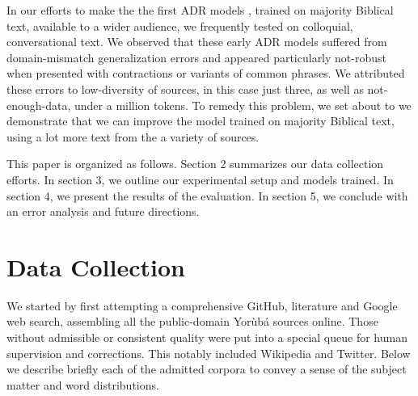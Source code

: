 \documentclass{article} %
\begin{document}
In our efforts to make the the first ADR models \citep{orife2018adr}, trained on majority Biblical text, available to a wider audience, we frequently tested on colloquial, conversational text. We observed that these early ADR models suffered from domain-mismatch generalization errors and appeared particularly not-robust when presented with contractions or variants of common phrases. We attributed these errors to low-diversity of sources, in this case just three, as well as not-enough-data, under a million tokens. To remedy this problem,  we set about to  we demonstrate that we can improve the model trained on majority Biblical text, using a lot more text from the a variety of sources.

This paper is organized as follows. Section 2 summarizes our data collection efforts. In section 3, we outline our experimental setup and models trained. In section 4, we present the results of the evaluation. In section 5, we conclude with an error analysis and future directions.

\section{Data Collection}\label{sec:collection}

We started by first attempting a comprehensive GitHub, literature and Google web search, assembling all the public-domain Yor{\`u}b{\'a} sources online. Those without admissible or consistent quality were put into a special queue for human supervision and corrections. This notably included Wikipedia and Twitter. Below we describe briefly each of the admitted corpora to convey a sense of the subject matter and word distributions. 
\end{document}
